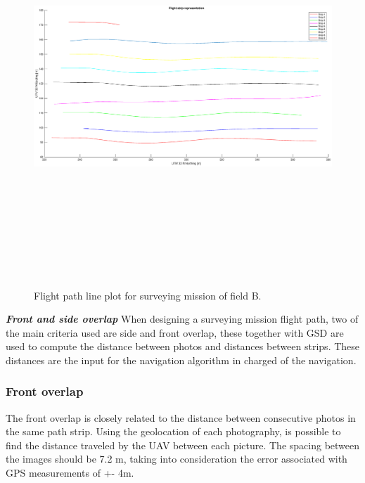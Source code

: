 \begin{figure}[H]
\includegraphics[width=\textwidth, height =15cm]{imagenes/strips.eps}
\caption{ Flight path line plot for surveying mission of field B.}
\label{fig:FielB}
\end{figure}

\textit{\textbf{Front and side overlap}}
When designing a surveying mission flight path, two of the main criteria used are side and front overlap, these together with GSD are used to compute the distance between photos and distances between strips. These distances are the input for the navigation algorithm in charged of the navigation.
\subsubsection{Front overlap}
The front overlap is closely related to the distance between consecutive photos in the same path strip.  Using the geolocation of each photography, is possible to find the distance traveled by the UAV between each picture. The spacing between the images should be 7.2 m, taking into consideration the error associated with GPS measurements of +- 4m. 

